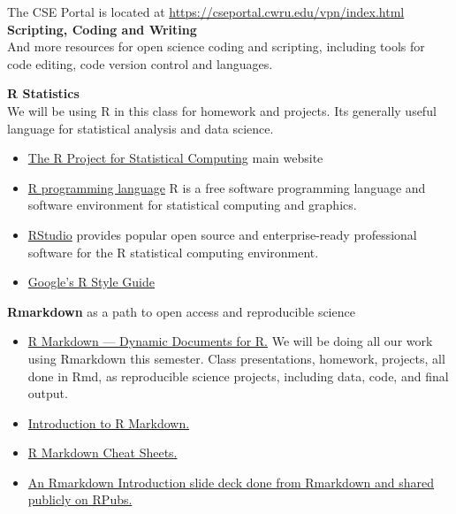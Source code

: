 \documentclass[11pt]{article} %
\begin{document}
The CSE Portal is located at \href{"https://cseportal.cwru.edu/vpn/index.html"}{https://cseportal.cwru.edu/vpn/index.html}    \\

{\bf Scripting, Coding and Writing} \\
And more resources for open science coding and scripting, including tools for code editing, code version control and languages. 

{\bf R Statistics} \\
  We will be using R in this class for homework and projects. 
  Its generally useful language for statistical analysis and data science. 
\begin{itemize}
	\item \href{"http://www.r-project.org/index.html"}{The R Project for Statistical Computing}  \cite{r_r_2014} main website
	\item \href{"http://en.wikipedia.org/wiki/R_(programming_language)"}{R programming language}  R is a free software programming language and software environment for statistical computing and graphics.\cite{r_project_r_2014} 
	\item \href{"http://www.rstudio.com/"}{ RStudio} provides popular open source and enterprise-ready professional software for the R statistical computing environment.  \cite{rstudio_rstudio_2014}
	\item \href{"https://google-styleguide.googlecode.com/svn/trunk/Rguide.xml"}{ Google's R Style Guide}
\end{itemize}

{\bf Rmarkdown} as a path to open access and reproducible science
\begin{itemize}
	\item \href{"http://rmarkdown.rstudio.com/"}{ R Markdown — Dynamic Documents for R.} We will be doing all our work using Rmarkdown this semester.  Class presentations, homework, projects, all done in Rmd, as reproducible science projects, including data, code, and final output.  
	\item \href{"http://shiny.rstudio.com/articles/rmarkdown.html"}{ Introduction to R Markdown.}
	\item \href{"http://www.rstudio.com/resources/cheatsheets/"}{ R Markdown Cheat Sheets.}
	\item \href{"http://rpubs.com/mansun_kuo/24330"}{ An Rmarkdown Introduction slide deck done from Rmarkdown and shared publicly on RPubs.}
\end{itemize}
\end{document}
